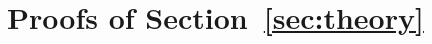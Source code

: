 
\newenvironment{restated}[1]{%
  \par\medskip\noindent\textbf{#1 (restated).}\hspace{0.4em}\ignorespaces
}{\par\smallskip}

\section{Proofs of Section~\ref{sec:theory}}
\label{app:proofs}


